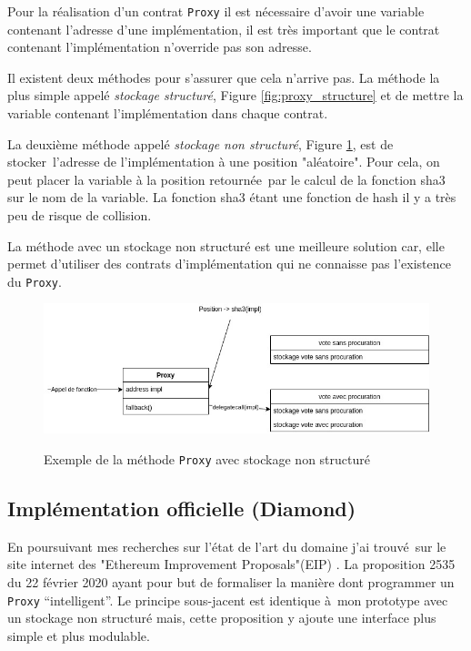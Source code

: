 Pour la réalisation d'un contrat \texttt{Proxy} il est nécessaire d'avoir une variable contenant l'adresse d'une implémentation, il est très important que le contrat contenant l'implémentation n'override pas son adresse.

Il existent deux méthodes pour s'assurer que cela n'arrive pas. La méthode la plus simple appelé  \emph{stockage structuré}, Figure \ref{fig:proxy_structure} et de mettre la variable contenant l'implémentation dans chaque contrat. 

La deuxième méthode appelé \emph{stockage non structuré}, Figure \ref{fig:proxy_unstructured}, est de stocker l'adresse de l'implémentation à une position "aléatoire".
Pour cela, on peut placer la variable à la position retournée par le calcul de la fonction sha3 sur le nom de la variable.
La fonction sha3 étant une fonction de hash il y a très peu de risque de collision.

La méthode avec un stockage non structuré est une meilleure solution car, elle permet d'utiliser des contrats d'implémentation qui ne connaisse pas l'existence du \texttt{Proxy}.

\begin{figure}[!t!]
  \caption{Exemple de la méthode \texttt{Proxy} avec stockage non structuré}
  \includegraphics[scale=0.4]{proxy_unstructured.jpg}
  \centering 
  \label{fig:proxy_unstructured}
\end{figure}

\subsection{Implémentation officielle (Diamond)}

En poursuivant mes recherches sur l'état de l'art du domaine j'ai trouvé sur le site internet des 
"Ethereum Improvement Proposals"(EIP) \cite{EIP}. La proposition 2535 du 22 février 2020 ayant pour but de formaliser
la manière dont programmer un \texttt{Proxy} ``intelligent''. Le principe sous-jacent est identique à mon prototype
avec un stockage non structuré mais, cette proposition y ajoute une interface plus simple et plus modulable.

